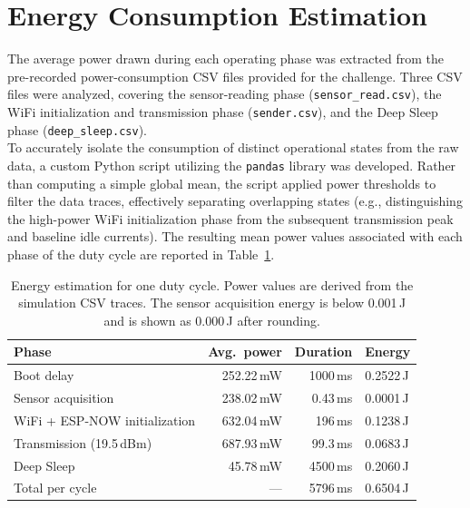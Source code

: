 \documentclass[a4paper,11pt]{article}
\begin{document}
\section{Energy Consumption Estimation}

The average power drawn during each operating phase was extracted from the 
pre-recorded power-consumption CSV files provided for the challenge. Three CSV files were analyzed, covering the sensor-reading phase (\texttt{sensor\_read.csv}), the WiFi initialization
and transmission phase (\texttt{sender.csv}), and the Deep Sleep phase
(\texttt{deep\_sleep.csv}). \\

To accurately isolate the consumption of distinct operational 
states from the raw data, a custom Python script utilizing the \texttt{pandas} library 
was developed. Rather than computing a simple global mean, the script applied power thresholds to filter the data traces, effectively separating overlapping states
(e.g., distinguishing the high-power WiFi initialization phase from the subsequent 
transmission peak and baseline idle currents). The resulting mean power values 
associated with each phase of the duty cycle are reported in Table~\ref{tab:energy}.

\begin{table}[H]
\centering
\begin{tabular}{>{\raggedright\arraybackslash}p{6.5cm}rrl}
\toprule
\textbf{Phase} & \textbf{Avg.\ power} & \textbf{Duration} & \textbf{Energy} \\
\midrule
Boot delay                    & 252.22\,mW &  1000\,ms & 0.2522\,J \\
Sensor acquisition            & 238.02\,mW &  0.43\,ms & 0.0001\,J \\
WiFi + ESP-NOW initialization & 632.04\,mW &  196\,ms  & 0.1238\,J \\
Transmission (19.5\,dBm)      & 687.93\,mW &  99.3\,ms & 0.0683\,J \\
Deep Sleep                    &  45.78\,mW & 4500\,ms  & 0.2060\,J \\
\midrule
Total per cycle               &   ---   & 5796\,ms  & 0.6504\,J \\
\bottomrule
\end{tabular}
\caption{Energy estimation for one duty cycle. Power values are derived from the
simulation CSV traces. The sensor acquisition energy is below 0.001\,J and is
shown as 0.000\,J after rounding.}
\label{tab:energy}
\end{table}
\end{document}
